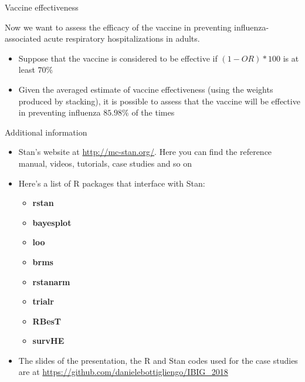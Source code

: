 \documentclass[ignorenonframetext,a4paper]{beamer}
\providecommand{\tightlist}{%
  \setlength{\itemsep}{0pt}\setlength{\parskip}{0pt}}
\begin{document}
\begin{frame}{Vaccine effectiveness}

Now we want to assess the efficacy of the vaccine in preventing
influenza-associated acute respiratory hospitalizations in adults.

\begin{itemize}
\setlength\itemsep{1em}
  \item{Suppose that the vaccine is considered to be effective if
        $(1 - OR) * 100$ is at least $70 \%$}
  \item{Given the averaged estimate of vaccine effectiveness (using
        the weights produced by stacking), it is
        possible to assess that the vaccine will be effective in
        preventing influenza $85.98 \%$ of the times}
\end{itemize}

\end{frame}

\begin{frame}{Additional information}

\begin{itemize}
\item
  Stan's website at \url{http://mc-stan.org/}. Here you can find the
  reference manual, videos, tutorials, case studies and so on
\item
  Here's a list of R packages that interface with Stan:

  \begin{itemize}
  \tightlist
  \item
    \textbf{rstan}
  \item
    \textbf{bayesplot}
  \item
    \textbf{loo}
  \item
    \textbf{brms}
  \item
    \textbf{rstanarm}
  \item
    \textbf{trialr}
  \item
    \textbf{RBesT}
  \item
    \textbf{survHE}
  \end{itemize}
\item
  The slides of the presentation, the R and Stan codes used for the case
  studies are at \url{https://github.com/danielebottigliengo/IBIG_2018}
\end{itemize}

\end{frame}
\end{document}
